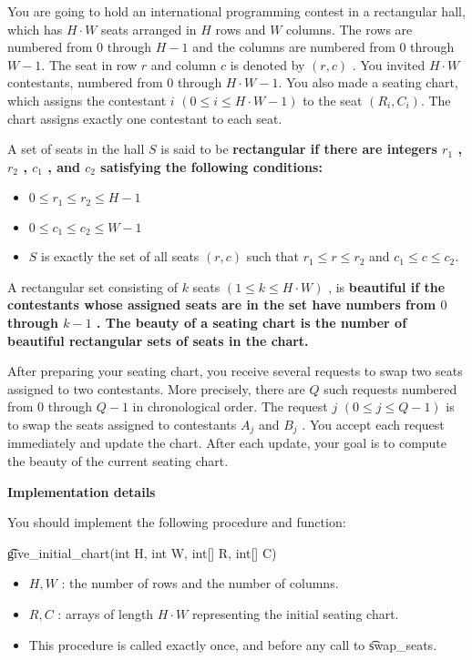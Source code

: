 You are going to hold an international programming contest in a rectangular hall, which has $ H \cdot W $ seats arranged in $ H $ rows and $ W $ columns. The rows are numbered from $ 0 $ through $ H-1 $ and the columns are numbered from $ 0 $ through $ W-1. $ The seat in row $ r $ and column $ c $ is denoted by $ (r, c) $ . You invited $ H \cdot W $ contestants, numbered from 0 through $ H \cdot W - 1. $ You also made a seating chart, which assigns the contestant $i$ $( 0 \le i \le H \cdot W-1 )$ to the seat $ (R_i, C_i).$ The chart assigns exactly one contestant to each seat. 

A set of seats in the hall $ S $ is said to be \bf{rectangular} if there are integers $ r_1 $ , $ r_2 $ , $ c_1 $ , and $ c_2 $ satisfying the following conditions:

\begin{itemize}
\item $ 0 \le r_1 \le r_2 \le H-1 $ 
\item $ 0 \le c_1 \le c_2 \le W-1 $ 
\item $ S $ is exactly the set of all seats $ (r, c) $ such that $ r_1 \le r \le r_2 $ and $c_1 \le c \le c_2$. 
\end{itemize}

A rectangular set consisting of $ k $ seats $ ( 1 \le k \le H \cdot W) $ , is \bf{beautiful} if the contestants whose assigned seats are in the set have numbers from $ 0 $ through $ k-1 $ . The \bf{beauty} of a seating chart is the number of beautiful rectangular sets of seats in the chart. 

After preparing your seating chart, you receive several requests to swap two seats assigned to two contestants. More precisely, there are $ Q $ such requests numbered from $ 0 $ through $ Q-1 $ in chronological order. The request $ j$ $(0 \le j \le Q-1) $ is to swap the seats assigned to contestants $ A_j $ and $ B_j $ . You accept each request immediately and update the chart. After each update, your goal is to compute the beauty of the current seating chart. 

\bf{Implementation details}

You should implement the following procedure and function:

\t{give_initial_chart(int H, int W, int[] R, int[] C)}

\begin{itemize}
\item $ H, W $ : the number of rows and the number of columns.
\item $ R, C $ : arrays of length $ H \cdot W $ representing the initial seating chart.
\item This procedure is called exactly once, and before any call to \t{swap_seats}.
\end{itemize}

